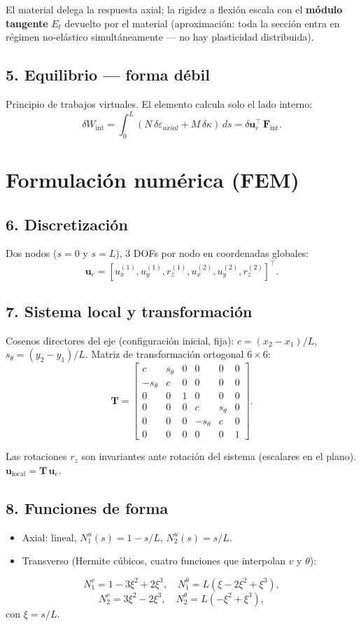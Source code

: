 \documentclass[11pt,letterpaper,oneside]{report}
\begin{document}
El material delega la respuesta axial; la rigidez a flexión escala con el \textbf{módulo tangente} $E_t$ devuelto por el material (aproximación: toda la sección entra en régimen no-elástico simultáneamente --- no hay plasticidad distribuida).

\subsection{5. Equilibrio --- forma débil}
Principio de trabajos virtuales. El elemento calcula solo el lado interno:
\[
\delta W_{\text{int}} = \int_0^L (N\,\delta\varepsilon_{axial} + M\,\delta\kappa)\,ds = \delta\mathbf u_e^\top\,\mathbf F_{\text{int}}.
\]


\section{Formulación numérica (FEM)}

\subsection{6. Discretización}
Dos nodos ($s = 0$ y $s = L$), 3 DOFs por nodo en coordenadas globales:
\[
\mathbf u_e = [u_x^{(1)}, u_y^{(1)}, r_z^{(1)}, u_x^{(2)}, u_y^{(2)}, r_z^{(2)}]^\top.
\]

\subsection{7. Sistema local y transformación}
Cosenos directores del eje (configuración inicial, fija): $c = (x_2 - x_1)/L$, $s_\theta = (y_2 - y_1)/L$. Matriz de transformación ortogonal $6\times 6$:
\[
\mathbf T = \begin{bmatrix}
 c & s_\theta & 0 & 0 & 0 & 0 \\
-s_\theta & c & 0 & 0 & 0 & 0 \\
 0 & 0 & 1 & 0 & 0 & 0 \\
 0 & 0 & 0 & c & s_\theta & 0 \\
 0 & 0 & 0 & -s_\theta & c & 0 \\
 0 & 0 & 0 & 0 & 0 & 1
\end{bmatrix}.
\]

Las rotaciones $r_z$ son invariantes ante rotación del sistema (escalares en el plano). $\mathbf u_{\text{local}} = \mathbf T\,\mathbf u_e$.

\subsection{8. Funciones de forma}
\begin{itemize}
  \item Axial: lineal, $N_1^u(s) = 1 - s/L$, $N_2^u(s) = s/L$.
  \item Transverso (Hermite cúbicos, cuatro funciones que interpolan $v$ y $\theta$):
\end{itemize}
\[
N_1^v = 1 - 3\xi^2 + 2\xi^3, \quad N_1^\theta = L(\xi - 2\xi^2 + \xi^3),
\]
\[
N_2^v = 3\xi^2 - 2\xi^3, \quad N_2^\theta = L(-\xi^2 + \xi^3),
\]
con $\xi = s/L$.
\end{document}

